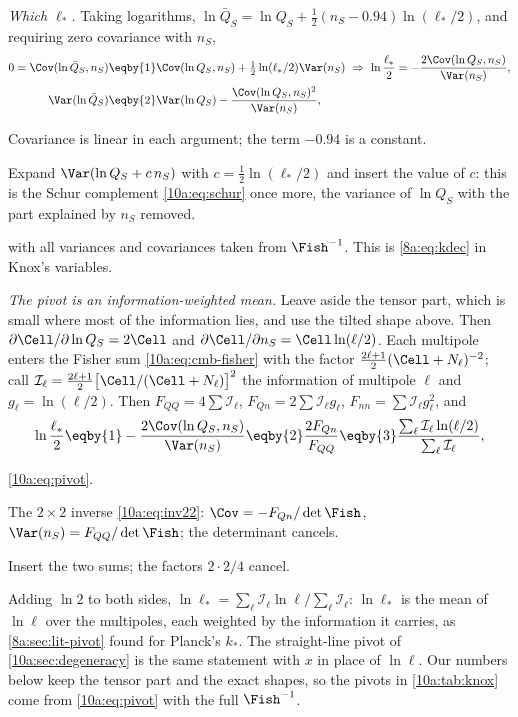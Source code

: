 \emph{Which $\ell_*$.} Taking logarithms, $\ln\bar Q_S=\ln Q_S+\frac12(n_S-0.94)\ln(\ell_*/2)$, and requiring zero
covariance with $n_S$,
\begin{align}
  0=\Cov(\ln\bar Q_S,n_S)
  &\eqby{1}\Cov(\ln Q_S,n_S)+\tfrac12\ln(\ell_*/2)\Var(n_S)
  \ \Rightarrow\
  \ln\frac{\ell_*}2=-\frac{2\Cov(\ln Q_S,n_S)}{\Var(n_S)},
  \nonumber\\
  \Var(\ln\bar Q_S)&\eqby{2}\Var(\ln Q_S)-\frac{\Cov(\ln Q_S,n_S)^2}{\Var(n_S)} ,
  \label{10a:eq:pivot}
\end{align}
\begin{explain}
  \item Covariance is linear in each argument; the term $-0.94$ is a constant.
  \item Expand $\Var(\ln Q_S+c\,n_S)$ with $c=\frac12\ln(\ell_*/2)$ and insert the value of $c$: this is the Schur complement
        \eqref{10a:eq:schur} once more, the variance of $\ln Q_S$ with the part explained by $n_S$ removed.
\end{explain}
with all variances and covariances taken from $\Fish^{-1}$. This is \eqref{8a:eq:kdec} in Knox's variables.

\emph{The pivot is an information-weighted mean.} Leave aside the tensor part, which is small where most of the
information lies, and use the tilted shape above. Then $\partial\Cell/\partial\ln Q_S=2\Cell$ and $\partial\Cell/\partial n_S=\Cell\ln(\ell/2)$. Each
multipole enters the Fisher sum \eqref{10a:eq:cmb-fisher} with the factor $\frac{2\ell+1}2(\Cell+N_\ell)^{-2}$; call
$\mathcal I_\ell=\frac{2\ell+1}2\bigl[\Cell/(\Cell+N_\ell)\bigr]^2$ the information of multipole $\ell$ and $g_\ell=\ln(\ell/2)$. Then
$F_{QQ}=4\sum\mathcal I_\ell$, $F_{Qn}=2\sum\mathcal I_\ell g_\ell$, $F_{nn}=\sum\mathcal I_\ell g_\ell^2$, and
\[
  \ln\frac{\ell_*}2
  \eqby{1}-\frac{2\Cov(\ln Q_S,n_S)}{\Var(n_S)}
  \eqby{2}\frac{2F_{Qn}}{F_{QQ}}
  \eqby{3}\frac{\sum_\ell\mathcal I_\ell\ln(\ell/2)}{\sum_\ell\mathcal I_\ell},
\]
\begin{explain}
  \item \eqref{10a:eq:pivot}.
  \item The $2\times2$ inverse \eqref{10a:eq:inv22}: $\Cov=-F_{Qn}/\det\Fish$, $\Var(n_S)=F_{QQ}/\det\Fish$; the determinant cancels.
  \item Insert the two sums; the factors $2\cdot2/4$ cancel.
\end{explain}
Adding $\ln2$ to both sides, $\ln\ell_*=\sum_\ell\mathcal I_\ell\ln\ell\big/\sum_\ell\mathcal I_\ell$: $\ln\ell_*$ is the mean of $\ln\ell$ over the multipoles, each weighted by the information it carries, as
\cref{8a:sec:lit-pivot} found for Planck's $k_*$. The straight-line pivot of \cref{10a:sec:degeneracy} is the same
statement with $x$ in place of $\ln\ell$. Our numbers below keep the tensor part and the exact shapes, so the
pivots in \cref{10a:tab:knox} come from \eqref{10a:eq:pivot} with the full $\Fish^{-1}$.

